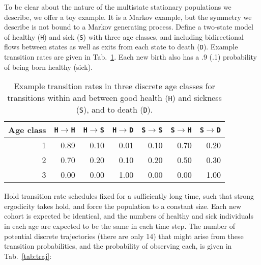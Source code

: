 \documentclass[12pt,oneside,a4paper]{article}
\theoremstyle{definition}
\begin{document}
To be clear about the nature of the multistate stationary populations we
describe, we offer a toy example. It is a Markov example, but the symmetry we describe is not bound to a Markov generating process.
Define a two-state model of healthy (\texttt{H}) and sick (\texttt{S}) with three age classes, and including bidirectional flows between states as well as exits from each state to death (\texttt{D}). Example transition rates are given in Tab.~\ref{tab:toy}. Each new birth also has a .9 (.1) probability of being born healthy (sick).
\begin{table}[ht]
\caption{Example transition rates in three discrete age classes for transitions within and between good health (\texttt{H}) and sickness (\texttt{S}), and to death (\texttt{D}).}
\label{tab:toy}
\centering
\begin{tabular}{rrrrrrr}
  \hline
Age class& \texttt{H}$\rightarrow$\texttt{H} & \texttt{H}$\rightarrow$\texttt{S} & \texttt{H}$\rightarrow$\texttt{D} & \texttt{S}$\rightarrow$\texttt{S} & \texttt{S}$\rightarrow$\texttt{H} & \texttt{S}$\rightarrow$\texttt{D} \\ 
  \hline
1 & 0.89 & 0.10 & 0.01 & 0.10 & 0.70 & 0.20 \\ 
  2 & 0.70 & 0.20 & 0.10 & 0.20 & 0.50 & 0.30 \\ 
  3 & 0.00 & 0.00 & 1.00 & 0.00 & 0.00 & 1.00 \\ 
   \hline
\end{tabular}\end{table}

\noindent Hold transition rate schedules fixed for a sufficiently long time, such that strong ergodicity takes hold, and force the population to a constant size. Each new cohort is expected be identical, and the numbers of healthy and sick individuals in each age are expected to be the same in each time step. The number of potential discrete trajectories (there are only 14) that might arise from these transition probabilities, and the probability of observing each, is given in Tab.~\ref{tab:traj}:
\end{document}
